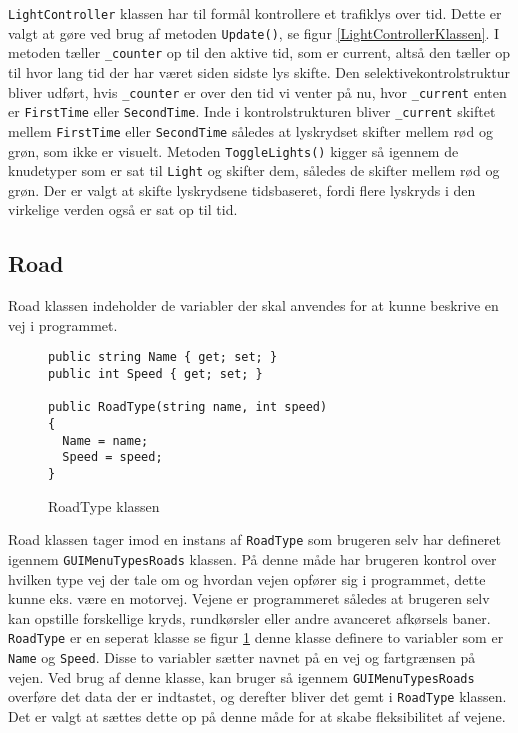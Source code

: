 \texttt{LightController} klassen har til formål kontrollere et trafiklys over tid. Dette er valgt at gøre ved brug af metoden \texttt{Update()}, se figur \ref{LightControllerKlassen}. I metoden tæller \texttt{\_counter} op til den aktive tid, som er current, altså den tæller op til hvor lang tid der har været siden sidste lys skifte. Den selektivekontrolstruktur bliver udført, hvis \texttt{\_counter} er over den tid vi venter på nu, hvor \texttt{\_current} enten er \texttt{FirstTime} eller \texttt{SecondTime}. Inde i kontrolstrukturen bliver \texttt{\_current} skiftet mellem \texttt{FirstTime} eller \texttt{SecondTime} således at lyskrydset skifter mellem rød og grøn, som ikke er visuelt. Metoden \texttt{ToggleLights()} kigger så igennem de knudetyper som er sat til \texttt{Light} og skifter dem, således de skifter mellem rød og grøn. Der er valgt at skifte lyskrydsene tidsbaseret, fordi flere lyskryds i den virkelige verden også er sat op til tid.

\subsection{Road}
Road klassen indeholder de variabler der skal anvendes for at kunne beskrive en vej i programmet.

\begin{figure}[H]
\begin{lstlisting}
public string Name { get; set; }
public int Speed { get; set; }
        
public RoadType(string name, int speed)
{
  Name = name;
  Speed = speed;
}
\end{lstlisting}
\caption{RoadType klassen}\label{RoadTypeKlasse}
\end{figure}

Road klassen tager imod en instans af \texttt{RoadType} som brugeren selv har defineret igennem  \texttt{GUIMenuTypesRoads} klassen. På denne måde har brugeren kontrol over hvilken type vej der tale om og hvordan vejen opfører sig i programmet, dette kunne eks. være en motorvej. Vejene er programmeret således at brugeren selv kan opstille forskellige kryds, rundkørsler eller andre avanceret afkørsels baner. \texttt{RoadType} er en seperat klasse se figur \ref{RoadTypeKlasse} denne klasse definere to variabler som er \texttt{Name} og \texttt{Speed}. Disse to variabler sætter navnet på en vej og fartgrænsen på vejen. Ved brug af denne klasse, kan bruger så igennem \texttt{GUIMenuTypesRoads} overføre det data der er indtastet, og derefter bliver det gemt i \texttt{RoadType} klassen. Det er valgt at sættes dette op på denne måde for at skabe fleksibilitet af vejene.
